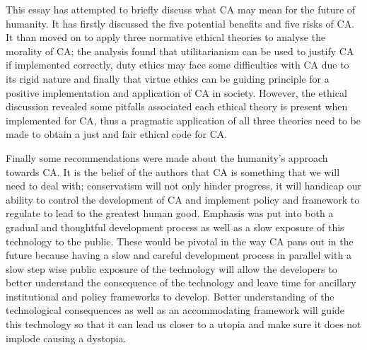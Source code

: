 This essay has attempted to briefly discuss what CA may mean for the future of humanity. It has firstly discussed the five potential benefits and five risks of CA. It than moved on to apply three normative ethical theories to analyse the morality of CA; the analysis found that utilitarianism can be used to justify CA if implemented correctly, duty ethics may face some difficulties with CA due to its rigid nature and finally that virtue ethics can be guiding principle for a positive implementation and application of CA in society. However, the ethical discussion revealed some pitfalls associated each ethical theory is present when implemented for CA, thus a pragmatic application of all three theories need to be made to obtain a just and fair ethical code for CA.

Finally some recommendations were made about the humanity's approach towards CA. It is the belief of the authors that CA is something that we will need to deal with; conservatism will not only hinder progress, it will handicap our ability to control the development of CA and implement policy and framework to regulate to lead to the greatest human good. Emphasis was put into both a gradual and thoughtful development process as well as a slow exposure of this technology to the public. These would be pivotal in the way CA pans out in the future because having a slow and careful development process in parallel with a slow step wise public exposure of the technology will allow the developers to better understand the consequence of the technology and leave time for ancillary institutional and policy frameworks to develop. Better understanding of the technological consequences as well as an accommodating framework will guide this technology so that it can lead us closer to a utopia and make sure it does not implode causing a dystopia.